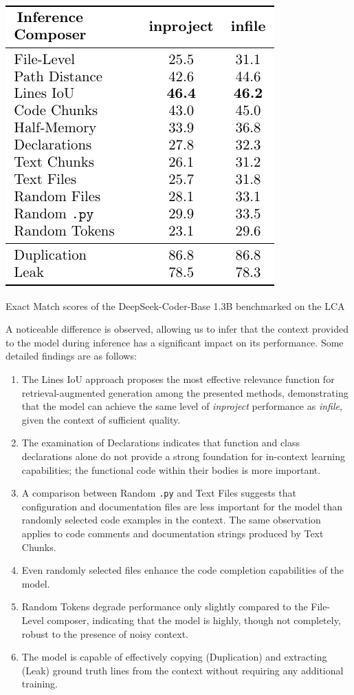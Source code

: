 \begin{table}[htbp]
    \centering
    \includegraphics{tables/rq_a1.pdf}
    \caption{Exact Match scores of the DeepSeek-Coder-Base 1.3B benchmarked on the LCA}\label{tab:dseek-inference}
\end{table}

A noticeable difference is observed, allowing us to infer that the context provided to the model during inference has a significant impact on its performance. Some detailed findings are as follows:

\begin{enumerate}
\item The Lines IoU approach proposes the most effective relevance function for retrieval-augmented generation among the presented methods, demonstrating that the model can achieve the same level of \textit{inproject} performance as \textit{infile}, given the context of sufficient quality.
\item The examination of Declarations indicates that function and class declarations alone do not provide a strong foundation for in-context learning capabilities; the functional code within their bodies is more important.
\item A comparison between Random \texttt{.py} and Text Files suggests that configuration and documentation files are less important for the model than randomly selected code examples in the context. The same observation applies to code comments and documentation strings produced by Text Chunks.
\item Even randomly selected files enhance the code completion capabilities of the model.
\item Random Tokens degrade performance only slightly compared to the File-Level composer, indicating that the model is highly, though not completely, robust to the presence of noisy context.
\item The model is capable of effectively copying (Duplication) and extracting (Leak) ground truth lines from the context without requiring any additional training.
\end{enumerate}

